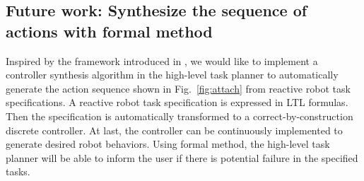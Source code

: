 \subsection{Future work: Synthesize the sequence of actions with formal method}
Inspired by the framework introduced in \cite{HKG2009}, we would like to implement a controller synthesis algorithm in the high-level task planner to automatically generate the action sequence shown in Fig.~\ref{fig:attach} from reactive robot task specifications.
A reactive robot task specification is expressed in LTL formulas.
Then the specification is automatically transformed to a correct-by-construction discrete controller.
At last, the controller can be continuously implemented to generate desired robot behaviors.
Using formal method, the high-level task planner will be able to inform the user if there is potential failure in the specified tasks.



